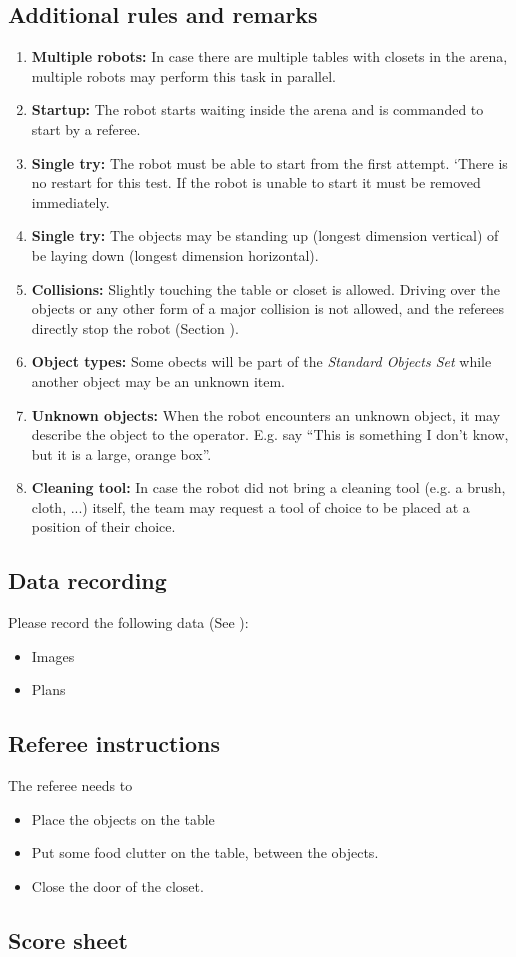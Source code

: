 \subsection{Additional rules and remarks}
\begin{enumerate}
\item \textbf{Multiple robots:} In case there are multiple tables with closets in the arena, multiple robots may perform this task in parallel. 
\item \textbf{Startup:} The robot starts waiting inside the arena and is commanded to start by a referee. 
\item \textbf{Single try:} The robot must be able to start from the first attempt. 
`There is no restart for this test. If the robot is unable to start it must be removed immediately.
\item \textbf{Single try:} The objects may be standing up (longest dimension vertical) of be laying down (longest dimension horizontal). 
\item \textbf{Collisions:} Slightly touching the table or closet is allowed. 
  Driving over the objects or any other form of a major collision is not allowed, and the referees directly stop the robot (Section ).
\item \textbf{Object types:} Some obects will be part of the \textit{Standard Objects Set} while another object may be an unknown item.
\item \textbf{Unknown objects:} When the robot encounters an unknown object, it may describe the object to the operator. E.g. say ``This is something I don't know, but it is a large, orange box''.
\item \textbf{Cleaning tool:} In case the robot did not bring a cleaning tool (e.g. a brush, cloth,  ...) itself, 
  the team may request a tool of choice to be placed at a position of their choice. 
\end{enumerate}

\subsection{Data recording}
  Please record the following data (See ):
  \begin{itemize}
   \item Images
   \item Plans
  \end{itemize}

\subsection{Referee instructions}

The referee needs to
\begin{itemize}
\item Place the objects on the table
\item Put some food clutter on the table, between the objects. 
\item Close the door of the closet. 
\end{itemize}

\subsection{Score sheet}

